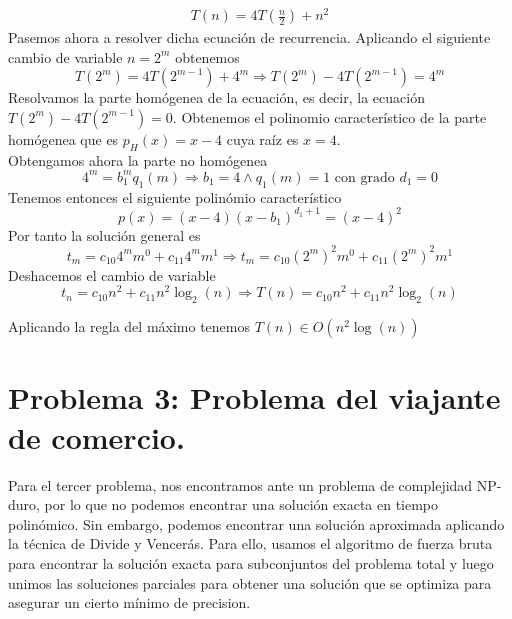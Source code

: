 \documentclass[11pt,openany]{book}
\begin{document}
\begin{gather*}
      T(n)= 4T(\frac{n}{2})+n^2
\end{gather*}
Pasemos ahora a resolver dicha ecuación de recurrencia. Aplicando el siguiente cambio de variable $n=2^m$ obtenemos
\begin{equation*}
      T(2^m)=4T(2^{m-1})+4^m \Longrightarrow T(2^m)-4T(2^{m-1})=4^m
\end{equation*}
  Resolvamos la parte homógenea de la ecuación, es decir, la ecuación $T(2^m)-4T(2^{m-1})=0$. Obtenemos el polinomio
  característico de la parte homógenea que es $p_H(x)=x-4$ cuya raíz es $x=4$. \\
  Obtengamos ahora la parte no homógenea
\begin{equation*}
      4^m=b_1^m q_1(m) \Longrightarrow b_1=4 \wedge q_1(m)=1 \text{ con grado } d_1=0
\end{equation*}
  Tenemos entonces el siguiente polinómio característico
\begin{equation*}
      p(x)=(x-4)(x-b_1)^{d_1+1}=(x-4)^2
\end{equation*}
  Por tanto la solución general es
\begin{equation*}
      t_m=c_{10}4^mm^0+c_{11}4^mm^1  {\Longrightarrow}  t_m=c_{10}(2^{m})^2m^0+c_{11}(2^{m})^2m^1  
\end{equation*}
Deshacemos el cambio de variable
\begin{equation*}
      t_n=c_{10}n^2+c_{11}n^2\log_2(n) \Longrightarrow T(n)=c_{10}n^2+c_{11}n^2\log_2(n)
\end{equation*}

  Aplicando la regla del máximo tenemos $T(n) \in O(n^2\log(n))$


\section{Problema 3: Problema del viajante de comercio.}
Para el tercer problema, nos encontramos ante un problema de complejidad
NP-duro, por lo que no podemos encontrar una solución exacta en tiempo polinómico.
Sin embargo, podemos encontrar una solución aproximada aplicando la técnica de Divide y Vencerás.
Para ello, usamos el algoritmo de fuerza bruta para encontrar la solución exacta para subconjuntos
del problema total y luego unimos las soluciones parciales para obtener una solución que se optimiza
para asegurar un cierto mínimo de precision.
\end{document}
